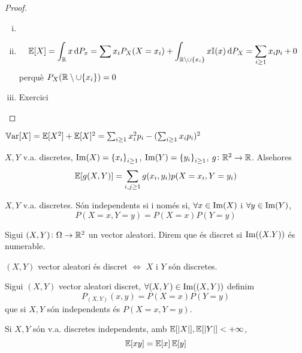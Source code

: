 \begin{proof}
    \begin{enumerate}[i)]
        \item[]
        \item \[        \esp[X] = \int_{\real}{x\dif P_x} = \sum{x_i P_X(X=x_i) + \int_{\real\setminus\cup\{x_i\}}{x\mathbb{I}(x) \dif P_X}} = \sum_{i \ge 1}{x_i p_i} + 0\]
            perquè $P_X(\mathbb{R}\setminus\cup\{x_i\}) = 0$
        \item Exercici
    \end{enumerate}
\end{proof}

\begin{obs}
    $\operatorname{\mathbb{V}ar}[X] = \operatorname{\mathbb{E}}[X^2] + \operatorname{\mathbb{E}}[X]^2 = \sum_{i \ge 1}{x_i^2 p_i} - (\sum_{i \ge 1}{x_i p_i})^2$
\end{obs}

\begin{prop}
    $X, Y$ v.a. discretes, $\operatorname{Im}(X) = \left\{ x_i \right\}_{i \ge 1}$, $\operatorname{Im}(Y) = \left\{ y_i \right\}_{i \ge 1}$, $g\colon \mathbb{R}^2\to\mathbb{R}$. Alsehores
    \[\operatorname{\mathbb{E}}[g(X,Y)] = \sum_{i,j \ge 1}{g(x_i,y_i) p(X=x_i, Y=y_i)}\]
\end{prop}

\begin{prop}
    $X,Y$ v.a. discretes. Són independents si i només si, $\forall x \in\operatorname{Im}(X)$ i $\forall y \in\operatorname{Im}(Y)$,
    \[P(X=x, Y=y) = P(X=x)P(Y=y)\]
\end{prop}

\begin{defi}
    Sigui $(X,Y)\colon \Omega\to\mathbb{R}^2$ un vector aleatori. Direm que és discret si $\operatorname{Im}((X.Y))$ és numerable.
\end{defi}

\begin{obs}
    $(X,Y)$ vector aleatori és discret $\iff$ $X$ i $Y$ són discretes.
\end{obs}

\begin{defi}
    Sigui $(X,Y)$ vector aleatori discret, $\forall(X,Y) \in \operatorname{Im}((X,Y))$ definim
    \[P_{(X,Y)}(x,y) = P(X=x)P(Y=y)\]
    que si $X,Y$ són independents és $P(X=x,Y=y)$.
\end{defi}

\begin{lema}
    Si $X,Y$ són v.a. discretes independents, amb $\operatorname{\mathbb{E}}[|X|], \operatorname{\mathbb{E}}[|Y|] < +\infty$,
    \[\operatorname{\mathbb{E}}[xy] = \operatorname{\mathbb{E}}[x]\operatorname{\mathbb{E}}[y]\]
\end{lema}

